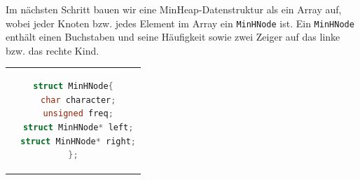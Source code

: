 \documentclass[course=erap]{aspdoc}
\begin{document}





Im nächsten Schritt bauen wir eine MinHeap-Datenstruktur als ein Array auf, wobei jeder Knoten bzw. jedes Element im Array ein \verb+MinHNode+ ist. Ein \verb+MinHNode+ enthält einen Buchstaben und seine Häufigkeit sowie zwei Zeiger auf das linke bzw. das rechte Kind.  \\
\begin{center}
\begin{tabular}{c}
\begin{lstlisting}[language=c, numbers=none, frame=none]
struct MinHNode{
  char character;
  unsigned freq;
  struct MinHNode* left;
  struct MinHNode* right;
};
\end{lstlisting}
\end{tabular}
\end{center}
\end{document}
